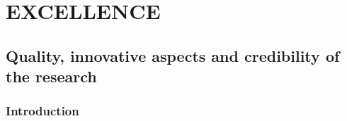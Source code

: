 \documentclass[a4paper,11pt]{article}
\begin{document}
\newpage
% 
% 



%     
% 

\section{EXCELLENCE} 
\label{sec:excellence}

%             

\subsection{Quality, innovative aspects and credibility of the research} %
\label{sec:quality}

\subsubsection{Introduction}
\end{document}
